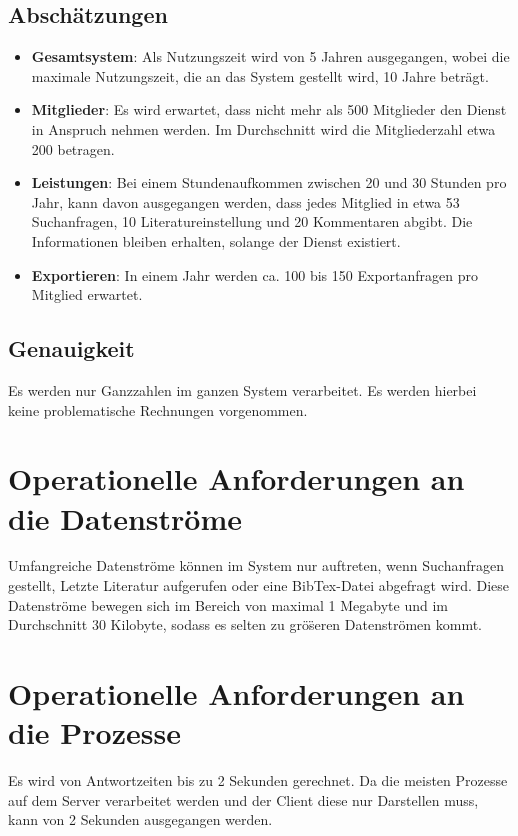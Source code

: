 \subsection{Abschätzungen}
\begin{itemize}
 \item \textbf{Gesamtsystem}: Als Nutzungszeit wird von 5 Jahren ausgegangen, wobei die maximale Nutzungszeit, 
die an das System gestellt wird, 10 Jahre betr\"agt.
 \item \textbf{Mitglieder}: Es wird erwartet, dass nicht mehr als 500 Mitglieder den Dienst in Anspruch nehmen werden. Im Durchschnitt wird
 die Mitgliederzahl etwa 200 betragen.
\item \textbf{Leistungen}: Bei einem Stundenaufkommen zwischen 20 und 30 Stunden pro Jahr, kann davon ausgegangen werden, dass jedes 
Mitglied in etwa 53 Suchanfragen, 10 Literatureinstellung und 20 Kommentaren abgibt. Die Informationen bleiben erhalten, solange der Dienst existiert.  
\item \textbf{Exportieren}: In einem Jahr werden ca. 100 bis 150 Exportanfragen pro Mitglied erwartet.
\end{itemize}

\subsection{Genauigkeit}
Es werden nur Ganzzahlen im ganzen System verarbeitet. Es werden hierbei keine problematische Rechnungen vorgenommen.

\section{Operationelle Anforderungen an die Datenströme}
Umfangreiche Datenstr\"ome k\"onnen im System nur auftreten, wenn Suchanfragen gestellt, Letzte Literatur aufgerufen oder eine BibTex-Datei abgefragt wird. 
Diese Datenstr\"ome bewegen sich im Bereich von maximal 1 Megabyte und im Durchschnitt 30 Kilobyte, sodass es selten
zu gr\"o\"seren Datenstr\"omen kommt.


\section{Operationelle Anforderungen an die Prozesse}
Es wird von Antwortzeiten bis zu 2 Sekunden gerechnet. Da die meisten Prozesse auf dem Server verarbeitet werden und der Client diese nur Darstellen muss, 
kann von 2 Sekunden ausgegangen werden. 

